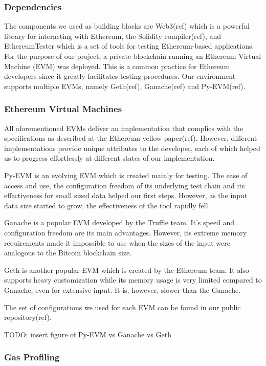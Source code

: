 \documentclass{article}
\begin{document}
  \subsubsection{Dependencies}

  The components we used as building blocks are Web3(ref) which is a
  powerful library for interacting with Ethereum, the Solidity
  compiler(ref), and EthereumTester which is a set of tools for testing
  Ethereum-based applications. For the purpose of our project, a private
  blockchain running an Ethereum Virtual Machine (EVM) was deployed.
  This is a common practice for Ethereum developers since it greatly
  facilitates testing procedures. Our environment supports multiple
  EVMs, namely Geth(ref), Ganache(ref) and Py-EVM(ref).

  \subsubsection{Ethereum Virtual Machines}

  All aforementioned EVMs deliver an implementation that complies with
  the specifications as described at the Ethereum yellow paper(ref).
  However, different implementations provide unique attributes to the
  developer, each of which helped us to progress effortlessly at
  different states of our implementation.

  Py-EVM is an evolving EVM which is created mainly for testing. The
  ease of access and use, the configuration freedom of its underlying
  test chain and its effectiveness for small sized data helped our first
  steps. However, as the input data size started to grow, the
  effectiveness of the tool rapidly fell.

  Ganache is a popular EVM developed by the Truffle team. It’s speed and
  configuration freedom are its main advantages. However, its extreme
  memory requirements made it impossible to use when the sizes of the
  input were analogous to the Bitcoin blockchain size.

  Geth is another popular EVM which is created by the Ethereum team. It
  also supports heavy customization while its memory usage is very
  limited compared to Ganache, even for extensive input. It is, however,
  slower than the Ganache.

  The set of configurations we used for each EVM can be found in our
  public repository(ref).

  TODO: insert figure of Py-EVM vs Ganache vs Geth

  \subsubsection{Gas Profiling}
\end{document}
